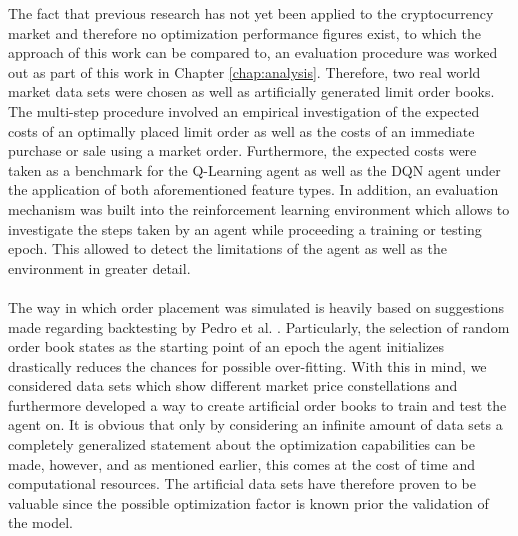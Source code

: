     The fact that previous research has not yet been applied to the cryptocurrency market and therefore no optimization performance figures exist, to which the approach of this work can be compared to, an evaluation procedure was worked out as part of this work in Chapter \ref{chap:analysis}.
    Therefore, two real world market data sets were chosen as well as artificially generated limit order books.
    The multi-step procedure involved an empirical investigation of the expected costs of an optimally placed limit order as well as the costs of an immediate purchase or sale using a market order.
    Furthermore, the expected costs were taken as a benchmark for the Q-Learning agent as well as the DQN agent under the application of both aforementioned feature types.
    In addition, an evaluation mechanism was built into the reinforcement learning environment which allows to investigate the steps taken by an agent while proceeding a training or testing epoch.
    This allowed to detect the limitations of the agent as well as the environment in greater detail.
    \\
    \\
    The way in which order placement was simulated is heavily based on suggestions made regarding backtesting by Pedro et al. \cite{de2018advances}.
    Particularly, the selection of random order book states as the starting point of an epoch the agent initializes drastically reduces the chances for possible over-fitting.
    With this in mind, we considered data sets which show different market price constellations and furthermore developed a way to create artificial order books to train and test the agent on.
    It is obvious that only by considering an infinite amount of data sets a completely generalized statement about the optimization capabilities can be made, however, and as mentioned earlier, this comes at the cost of time and computational resources.
    The artificial data sets have therefore proven to be valuable since the possible optimization factor is known prior the validation of the model. 
    
